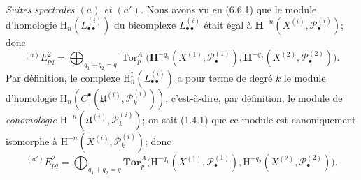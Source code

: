 \begin{env}[6.6.3]
\emph{Suites spectrales $(a)$ et $(a')$.} Nous avons vu en (6.6.1) que le
module d'homologie $\mathrm H_n(L_{\bullet\bullet}^{(i)})$ du bicomplexe
$L_{\bullet\bullet}^{(i)}$ était égal à
$\mathbf H^{-n}(X^{(i)},\mathscr P_\bullet^{(i)})$; donc
\[
  {}^{(a)}E_{pq}^2
  =\bigoplus_{q_1+q_2=q}
   \operatorname{Tor}_p^A
   \bigl(\mathbf H^{-q_1}(X^{(1)},\mathscr P_\bullet^{(1)}),
         \mathbf H^{-q_2}(X^{(2)},\mathscr P_\bullet^{(2)})\bigr).
\]
Par définition, le complexe
$\mathrm H_n^{\mathrm I}(L_{\bullet\bullet}^{(i)})$ a pour terme de degré $k$
le module d'homologie
$\mathrm H_n(C^\bullet(\mathfrak U^{(i)},\mathscr P_k^{(i)}))$, c'est-à-dire,
par définition, le module de \emph{cohomologie}
$\mathrm H^{-n}(\mathfrak U^{(i)},\mathscr P_k^{(i)})$; on sait (1.4.1) que
ce module est canoniquement isomorphe à
$\mathrm H^{-n}(X^{(i)},\mathscr P_k^{(i)})$; donc
\[
  {}^{(a')}E_{pq}^2
  =\bigoplus_{q_1+q_2=q}
   \mathbf{Tor}_p^A
   \bigl(\mathrm H^{-q_1}(X^{(1)},\mathscr P_\bullet^{(1)}),
         \mathrm H^{-q_2}(X^{(2)},\mathscr P_\bullet^{(2)})\bigr).
\]
\end{env}

